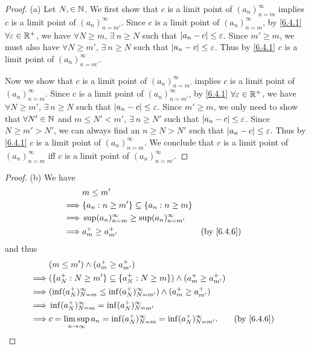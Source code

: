 \begin{proof}{(a)}
  Let \(N, \in \mathbb{N}\).
  We first show that \(c\) is a limit point of \((a_n)_{n = m}^\infty\) implies \(c\) is a limit point of \((a_n)_{n = m'}^\infty\).
  Since \(c\) is a limit point of \((a_n)_{n = m}^\infty\), by \cref{6.4.1} \(\forall \varepsilon \in \mathbb{R}^+\), we have \(\forall N \geq m\), \(\exists\ n \geq N\) such that \(\left\lvert a_n - c\right\rvert \leq \varepsilon\).
  Since \(m' \geq m\), we must also have \(\forall N \geq m'\), \(\exists\ n \geq N\) such that \(\left\lvert a_n - c\right\rvert \leq \varepsilon\).
  Thus by \cref{6.4.1} \(c\) is a limit point of \((a_n)_{n = m'}^\infty\).

  Now we show that \(c\) is a limit point of \((a_n)_{n = m'}^\infty\) implies \(c\) is a limit point of \((a_n)_{n = m}^\infty\).
  Since \(c\) is a limit point of \((a_n)_{n = m'}^\infty\), by \cref{6.4.1} \(\forall \varepsilon \in \mathbb{R}^+\), we have \(\forall N \geq m'\), \(\exists\ n \geq N\) such that \(\left\lvert a_n - c\right\rvert \leq \varepsilon\).
  Since \(m' \geq m\), we only need to show that \(\forall N' \in \mathbb{N}\) and \(m \leq N' < m'\), \(\exists\ n \geq N'\) such that \(\left\lvert a_n - c\right\rvert \leq \varepsilon\).
  Since \(N \geq m' > N'\), we can always find an \(n \geq N > N'\) such that \(\left\lvert a_n - c\right\rvert \leq \varepsilon\).
  Thus by \cref{6.4.1} \(c\) is a limit point of \((a_n)_{n = m}^\infty\).
  We conclude that \(c\) is a limit point of \((a_n)_{n = m}^\infty\) iff \(c\) is a limit point of \((a_n)_{n = m'}^\infty\).
\end{proof}

\begin{proof}{(b)}
  We have
  \begin{align*}
             & m \leq m'                                                                             \\
    \implies & \{a_n : n \geq m'\} \subseteq \{a_n : n \geq m\}                                      \\
    \implies & \sup(a_n)_{n = m}^\infty \geq \sup(a_n)_{n = m'}^\infty                               \\
    \implies & a_m^+ \geq a_{m'}^+                                     &  & \text{(by \cref{6.4.6})}
  \end{align*}
  and thus
  \begin{align*}
             & (m \leq m') \land (a_m^+ \geq a_{m'}^+)                                                                                  \\
    \implies & (\{a_N^+ : N \geq m'\} \subseteq \{a_N^+ : N \geq m\}) \land (a_m^+ \geq a_{m'}^+)                                       \\
    \implies & (\inf(a_N^+)_{N = m}^\infty \leq \inf(a_N^+)_{N = m'}^\infty) \land (a_m^+ \geq a_{m'}^+)                                \\
    \implies & \inf(a_N^+)_{N = m}^\infty = \inf(a_N^+)_{N = m'}^\infty                                                                 \\
    \implies & c = \limsup_{n \to \infty} a_n = \inf(a_N^+)_{N = m}^\infty = \inf(a_N^+)_{N = m'}^\infty. &  & \text{(by \cref{6.4.6})}
  \end{align*}
\end{proof}

